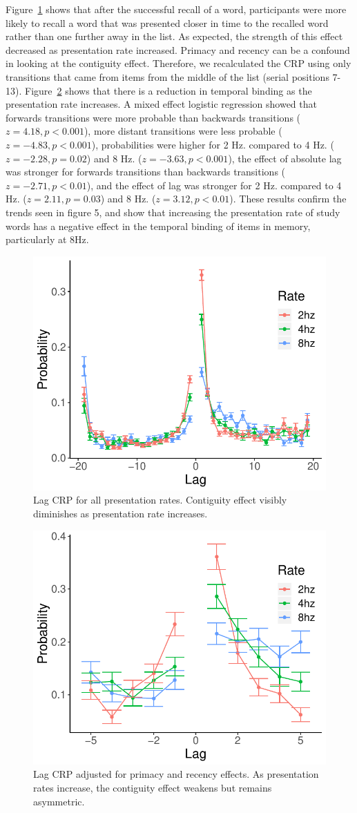 \documentclass[10pt,letterpaper]{article}
\begin{document}
Figure~\ref{uCRP} shows that after the successful recall of a word, participants were more likely to recall a word that was presented closer in time to the recalled word rather than one further away in the list. As expected, the strength of this effect decreased as presentation rate increased.
Primacy and recency can be a confound in looking at the contiguity effect. Therefore, we recalculated the CRP using only transitions that came from items from the middle of the list (serial positions 7-13). Figure~\ref{CRP} shows that there is a reduction in temporal binding as the presentation rate increases. A mixed effect logistic regression showed that forwards transitions were more probable than backwards transitions ($z = 4.18, p<0.001$), more distant transitions were less probable ($z=-4.83, p<0.001$), probabilities were higher for 2 Hz. compared to 4 Hz. ($z=-2.28, p=0.02$) and 8 Hz. ($z=-3.63, p<0.001$), the effect of absolute lag was stronger for forwards transitions than backwards transitions ($z=-2.71, p<0.01$), and the effect of lag was stronger for 2 Hz. compared to 4 Hz. ($z=2.11, p=0.03$) and 8 Hz. ($z=3.12, p<0.01$). These results confirm the trends seen in figure 5, and show that increasing the presentation rate of study words has a negative effect in the temporal binding of items in memory, particularly at 8Hz.

\begin{figure}[H]
\begin{center}
\includegraphics[width = .4\textwidth]{CRP_unadjusted.pdf}
\end{center}
\caption{Lag CRP for all presentation rates. Contiguity effect visibly diminishes as presentation rate increases.} 
\label{uCRP}
\end{figure}

\begin{figure}[H]
\begin{center}
\includegraphics[width = .4\textwidth]{CRP_adjusted.pdf}
\end{center}
\caption{Lag CRP adjusted for primacy and recency effects. As presentation rates increase, the contiguity effect weakens but remains asymmetric.} 
\label{CRP}
\end{figure}
\end{document}
